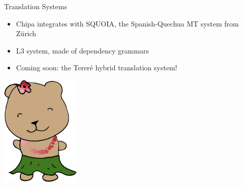 \documentclass[final]{beamer}
\begin{document}
\begin{frame}{}
\begin{columns}[t]
\begin{column}{.32\linewidth}
  \begin{block}{\large Translation Systems}
    \centering
    \begin{itemize}
    \item Chipa integrates with SQUOIA, the Spanish-Quechua MT system from Zürich
    \item L3 system, made of dependency grammars
    \item Coming soon: the Tereré hybrid translation system!
    \end{itemize}
  \end{block}
  \hfill
  \includegraphics[width=.15\linewidth]{hltdi-logo-small.png}


  \end{column}

\end{columns}

\end{frame}
\end{document}
